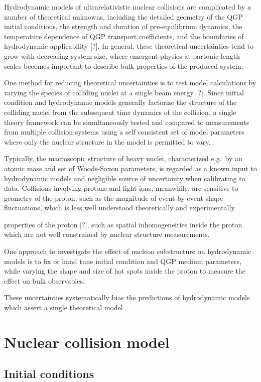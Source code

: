 \documentclass[aps,prc,reprint,amsmath,nofootinbib]{revtex4-1}
\newcommand{\note}{\textcolor{theblue}{[?]}}
\begin{document}
  Hydrodynamic models of ultrarelativistic nuclear collisions are complicated by a number of theoretical unknowns, including the detailed geometry of the QGP initial conditions, the strength and duration of pre-equilibrium dynamics, the temperature dependence of QGP transport coefficients, and the boundaries of hydrodynamic applicability \note.
In general, these theoretical uncertainties tend to grow with decreasing system size, where emergent physics at partonic length scales becomes important to describe bulk properties of the produced system.

  One method for reducing theoretical uncertainties is to test model calculations by varying the species of colliding nuclei at a single beam energy \note.
Since initial condition and hydrodynamic models generally factorize the structure of the colliding nuclei from the subsequent time dynamics of the collision, a single theory framework can be simultaneously tested and compared to measurements from multiple collision systems using a self consistent set of model parameters where only the nuclear structure in the model is permitted to vary.

Typically, the macroscopic structure of heavy nuclei, characterized e.g.\ by an atomic mass and set of Woods-Saxon parameters, is regarded as a known input to hydrodynamic models and negligible source of uncertainty when calibrating to data.
Collisions involving protons and light-ions, meanwhile, are sensitive to geometry of the proton, such as the magnitude of event-by-event shape fluctuations, which is less well understood theoretically and experimentally.


properties of the proton \note, such as spatial inhomogeneities inside the proton which are not well constrained by nuclear structure measurements.

One approach to investigate the effect of nucleon substructure on hydrodynamic models is to fix or hand tune initial condition and QGP medium parameters, while varying the shape and size of hot spots inside the proton to measure the effect on bulk observables.

These uncertainties systematically bias the predictions of hydrodynamic models which assert a single theoretical model

\section{Nuclear collision model}


\subsection{Initial conditions}
\end{document}
